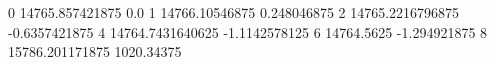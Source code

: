 0 14765.857421875 0.0
1 14766.10546875 0.248046875
2 14765.2216796875 -0.6357421875
4 14764.7431640625 -1.1142578125
6 14764.5625 -1.294921875
8 15786.201171875 1020.34375
